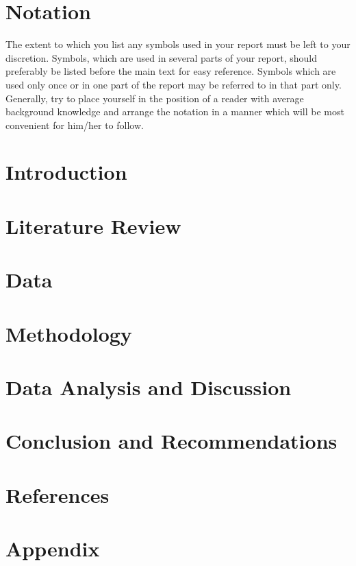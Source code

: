 \documentclass[a4paper,11]{article}
\begin{document}
\section*{Notation}
The extent to which you list any symbols used in your report must be left to your discretion. Symbols, which are used in several parts of your report, should preferably be listed before the main text for easy reference. Symbols which are used only once or in one part of the report may be referred to in that part only. Generally, try to place yourself in the position of a reader with average background knowledge and arrange the notation in a manner which will be most convenient for him/her to follow.
\pagebreak

\tableofcontents
\pagebreak
\listoffigures
\listoftables
\pagebreak
\newpage


\cleardoublepage{}

\section{Introduction}

\pagebreak

\section{Literature Review}

\pagebreak

\section{Data}

\pagebreak

\section{Methodology}

\pagebreak


\section{Data Analysis and Discussion}

\pagebreak

\section{Conclusion and Recommendations}

\pagebreak

\section{References}

\pagebreak


\section{Appendix}

\end{document}
